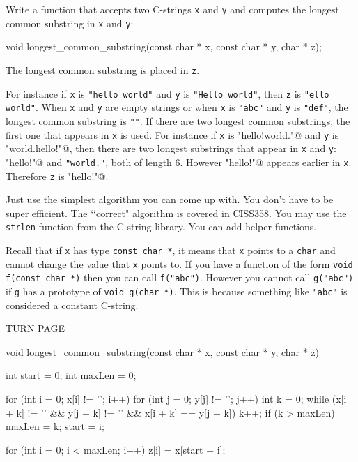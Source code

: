 

\nextq
Write a function that accepts two C-strings \verb!x! and \verb!y! and
computes the longest common substring in \verb!x! and \verb!y!:
\begin{console}
void longest_common_substring(const char * x, const char * y, char * z);
\end{console}
The longest common substring is placed in \verb!z!.

For instance if \verb!x! is \verb!"hello world"! and \verb!y! is
\verb!"Hello world"!, then \verb!z! is \verb!"ello world"!.
When \verb!x! and \verb!y! are empty strings
or when \verb!x! is \verb!"abc"! and \verb!y! is \verb!"def"!, the longest
common substring is \verb!""!.
If there are two longest common substrings, the first one that appears
in \verb!x! is used.
For instance if \verb!x! is \verb@"hello!world."@ and
\verb!y! is \verb@"world.hello!"@, then there are two longest substrings
that appear in \verb!x! and \verb!y!: \verb@"hello!"@ and \verb!"world."!,
both of length 6. However \verb@"hello!"@ appears earlier in \verb!x!.
Therefore \verb!z! is \verb@"hello!"@.

Just use the simplest algorithm you can come up with.
You don't have to be super efficient.
The \lq\lq correct" algorithm is covered in CISS358.
You may use the \verb!strlen! function from the C-string library.
You can add helper functions.

Recall that if \verb!x! has type \verb!const char *!,
it means that \verb!x! points to a \verb!char! and cannot change
the value that \verb!x! points to.
If you have a function of the form
\verb!void f(const char *)!
then you can call \verb!f("abc")!.
However you cannot call \verb!g("abc")! if \verb!g! has a prototype
of \verb!void g(char *)!.
This is because something like \verb!"abc"! is considered a
constant C-string.

TURN PAGE

\newpage
\ANSWER
\begin{answercode}
void longest_common_substring(const char * x, const char * y, char * z)
{
   int start = 0;
   int maxLen = 0;
    
    for (int i = 0; x[i] != '\0'; i++)
    {
        for (int j = 0; y[j] != '\0'; j++)
        {
            int k = 0;
            while (x[i + k] != '\0' && y[j + k] != '\0'
                   && x[i + k] == y[j + k])
            {
                k++;
            }
            if (k > maxLen)
            {
                maxLen = k;
                start = i;
            }
        }
    }

    for (int i = 0; i < maxLen; i++)
    {
        z[i] = x[start + i];
    }
}
\end{answercode}

